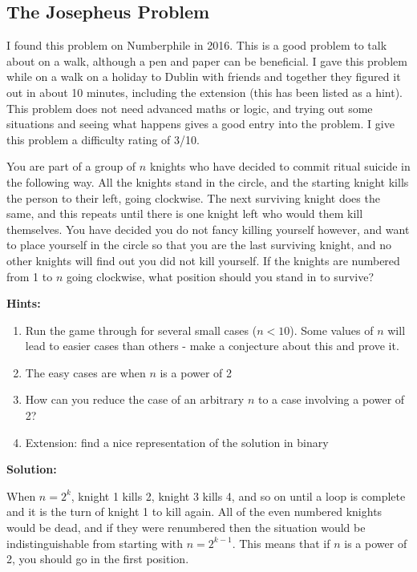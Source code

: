 \subsection{The Josepheus Problem}

I found this problem on Numberphile in 2016. This is a good problem to talk about on a walk, although a pen and paper can be beneficial. I gave this problem while on a walk on a holiday to Dublin with friends and together they figured it out in about 10 minutes, including the extension (this has been listed as a hint). This problem does not need advanced maths or logic, and trying out some situations and seeing what happens gives a good entry into the problem. I give this problem a difficulty rating of 3/10.

You are part of a group of $n$ knights who have decided to commit ritual suicide in the following way. All the knights stand in the circle, and the starting knight kills the person to their left, going clockwise. The next surviving knight does the same, and this repeats until there is one knight left who would them kill themselves. You have decided you do not fancy killing yourself however, and want to place yourself in the circle so that you are the last surviving knight, and no other knights will find out you did not kill yourself. If the knights are numbered from 1 to $n$ going clockwise, what position should you stand in to survive?

\textbf{Hints:}

\begin{enumerate}
	\item Run the game through for several small cases ($n < 10$). Some values of $n$ will lead to easier cases than others - make a conjecture about this and prove it.
	\item The easy cases are when $n$ is a power of 2
	\item How can you reduce the case of an arbitrary $n$ to a case involving a power of 2?
	\item Extension: find a nice representation of the solution in binary
\end{enumerate}

\textbf{Solution:}

When $n = 2^k$, knight 1 kills 2, knight 3 kills 4, and so on until a loop is complete and it is the turn of knight 1 to kill again. All of the even numbered knights would be dead, and if they were renumbered then the situation would be indistinguishable from starting with $n = 2^{k - 1}$. This means that if $n$ is a power of 2, you should go in the first position.

